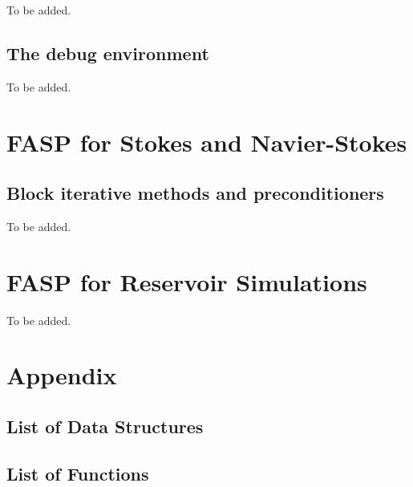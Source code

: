\documentclass[11pt]{memoir}
\begin{document}
To be added.

\section{The debug environment}\label{sec:debug}

To be added.

\chapter{FASP for Stokes and Navier-Stokes}\label{ch:ns}

\section{Block iterative methods and preconditioners}\label{sec:block}

To be added.

\chapter{FASP for Reservoir Simulations}\label{ch:blkoil}

To be added.


\chapter*{Appendix}\label{ch:append}

\section*{List of Data Structures}

\section*{List of Functions}


\newpage
\begin{footnotesize}


\end{footnotesize}
\end{document}
